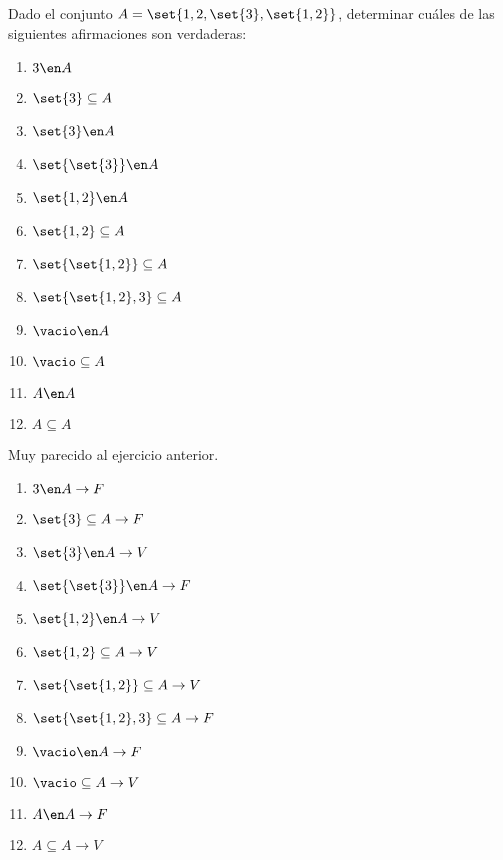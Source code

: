\begin{enunciado}{\ejercicio}

  Dado el conjunto $A = \set{1,2,\set{3},\set{1,2}}$,
  determinar cuáles de las siguientes afirmaciones son verdaderas:

  \begin{multicols}{4}
    \begin{enumerate}[label=(\roman*)]
      \item $3 \en A         $
      \item $\set{3} \subseteq A $
      \item $\set{3} \en A    $
      \item $\set{\set{3}} \en A $
      \item $\set{1,2} \en A $
      \item $\set{1,2} \subseteq A  $
      \item $\set{\set{1,2}} \subseteq A  $
      \item $\set{\set{1,2}, 3} \subseteq A  $
      \item $\vacio \en A  $
      \item $\vacio \subseteq A  $
      \item $A \en A  $
      \item $A \subseteq A  $
    \end{enumerate}
  \end{multicols}
\end{enunciado}

Muy parecido al ejercicio anterior.

\begin{multicols}{3}
  \begin{enumerate}[label=(\roman*)]
    \item $3 \en A \to F  $

    \item $\set{3} \subseteq A \to F$

    \item $\set{3} \en A    \to V$

    \item $\set{\set{3}} \en A \to F$

    \item $\set{1,2} \en A \to V$

    \item $\set{1,2} \subseteq A \to V $

    \item $\set{\set{1,2}} \subseteq A \to V $

    \item $\set{\set{1,2}, 3} \subseteq A \to F$

    \item $\vacio \en A \to F $
    \item $\vacio \subseteq A \to V $
    \item $A \en A \to F $
    \item $A \subseteq A \to V $
  \end{enumerate}
\end{multicols}

\begin{aportes}
  \item {}
\end{aportes}
